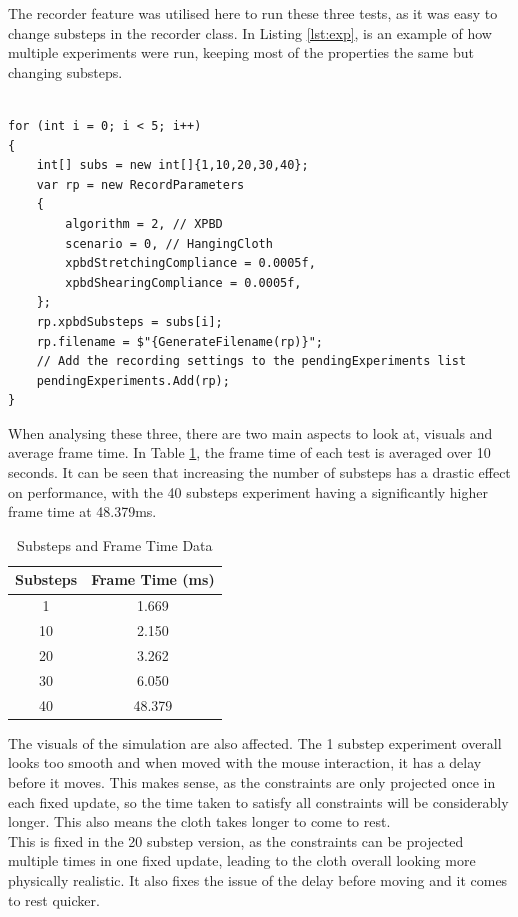 \documentclass[12pt,a4paper]{article}
\begin{document}
The recorder feature was utilised here to run these three tests, as it was easy to change substeps in the recorder class. In Listing \ref{lst:exp}, is an example of how multiple experiments were run, keeping most of the properties the same but changing substeps. \\ \\
\begin{lstlisting}[caption={Utilising the recorder feature},label={lst:exp}]
for (int i = 0; i < 5; i++)
{
	int[] subs = new int[]{1,10,20,30,40};
	var rp = new RecordParameters
	{
		algorithm = 2, // XPBD
		scenario = 0, // HangingCloth
		xpbdStretchingCompliance = 0.0005f, 
		xpbdShearingCompliance = 0.0005f, 
	};
	rp.xpbdSubsteps = subs[i];
	rp.filename = $"{GenerateFilename(rp)}";
	// Add the recording settings to the pendingExperiments list
	pendingExperiments.Add(rp);
}
\end{lstlisting}
When analysing these three, there are two main aspects to look at, visuals and average frame time. In Table \ref{tab:sub}, the frame time of each test is averaged over 10 seconds. It can be seen that increasing the number of substeps has a drastic effect on performance, with the 40 substeps experiment having a significantly higher frame time at 48.379ms.\\
\begin{table}[htbp]
	\centering
	\caption{Substeps and Frame Time Data}
	\label{tab:sub}
	\begin{tabular}{cc}
		\toprule
		Substeps & Frame Time (ms) \\
		\midrule
		1 & 1.669 \\
		10 & 2.150 \\
		20 & 3.262 \\
		30 & 6.050 \\
		40 & 48.379 \\
		\bottomrule
	\end{tabular}
\end{table}

The visuals of the simulation are also affected. The 1 substep experiment overall looks too smooth and when moved with the mouse interaction, it has a delay before it moves. This makes sense, as the constraints are only projected once in each fixed update, so the time taken to satisfy all constraints will be considerably longer. This also means the cloth takes longer to come to rest. \\

This is fixed in the 20 substep version, as the constraints can be projected multiple times in one fixed update, leading to the cloth overall looking more physically realistic. It also fixes the issue of the delay before moving and it comes to rest quicker. \\
\end{document}
